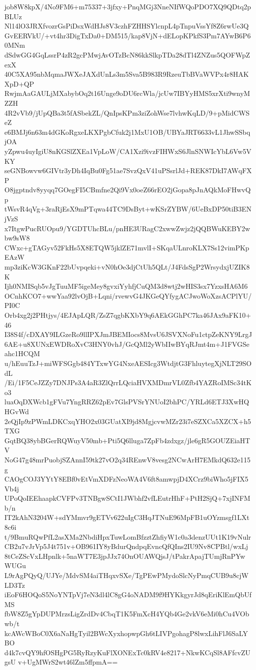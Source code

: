 job8W8kpX/4No9FM6+m75337+3jfxy+PnqMGj3NneNIfWQoPDO7XQ9QDtq2pBLUz
Nl14lO3JRXfvozrGsPiDsxWdHJs8V3czhFZHHSYlcnpL4pTnpuVssYf8Z6rwUe3Q
GvEERVkU/+vt4hr3DigTxDa0+DM515/kap8VjN+dELopKPkfS3Pm7AYwB6P60MNm
dSdwGG4GqLssrP4zR2gcPMwjAvOTzBcN86kkSlkpTDa28dTl4ZNZus5QOFWpZexX
40C5XA95nbMqmaJWXeJAXdUnLs3m5Sva5B983R9RzeuTbBVaWVPx4r8HAKXpD+QP
RwjmAaGAULjMXabybOq2t16Unge9oDU6rcWla/jcUw7IBYyHMS5xrXti9wnyMZZH
4R2vVb9/jUpQBa3t5fASbekZL/QnIpsKPm3ziZohWse7lvhwKqLD/9+pMidCWSeZ
e6BMJj6n63m4dGKoRgxeLKXPgbCfuk2j1MxU1OB/UBYaJRT6633vL1JhwSSbqjOA
yZpwu4uyIgiU8nKGSlZXEa1VpLoW/CA1Xzi9ivzFIHWxS6JlnSNWIcYbL6Vw5VKY
seGNBowvw6GIVtr3yDh4IqBu0Fg51ae7SvzQxV41uPSsrlJd+REK87DkI7AWqFXP
O8jgptndv8yyqq7GOegFI5CBmfne2Qi9Vx0oeZ66rEO2jGopa8pJnAQkMoFHwvQp
tWsvR4qVg+3raRjEsX9mPTqwa44TC9DsByt+wKSrZYBW/6UeBxDP50tiB3ENjVzS
x7ItgwPucRUOpu9/YGDTUhcBLu/pnHE3URagC2xwwZwjz2jQQBWuKEBY2wbw9sW8
CWxc+gTAGyv52FkHs5X8ETQW5jklZE71mvlI+SKqaULnroKLX7Ss12vimPKpEAzW
mp3ziKcW3GKnF22bUvpqeki+vN0hOe3djCtUh5QLt/J4FdsSgP2WrsydxjUZIK8K
Ijh0NMISqb5vJgTuuMF5igeMey8gvxiYyhfjCuQM3d8wtj2wHIS3sx7YzxsHA6M6
OCnhKCO7+wwYaa92lvOjB+Lqni/rvewvG4JKGeQYfygACJwoWoXzsACPlYU/PI0C
Orb4xg2j2PHtjys/4EJApLQR/ZsZ7qgbKXbY9q6AEkGGhPC7ka46JAx9aFK10+46
I38S4f/cDXAY9ILGzeRo9llIPXJmJBEMIocs8MvsU6JSVXNoFu1ctpZeKNY9LrgJ
6AE+u8XUNxEWDRoXvC3HNY0vhJ/GcQMl2yWbIIwBYqRJmt4m+J1FVGSeahc1HCQM
u/hEuuTzJ+miWFSGgb484YTxwYG4NxeAESIcg3WtdjtG3FhluytegXjNLT29SOdL
/Ei/1F5CeJZZy7DNJPs3A4aR3ZlQrrLQciaHVXMDmrVL0Zfb4YAZRoIMSc34tKo3
luaOqDXWcb1gFVu7YngRRZ62pEv7GlsPVSrYNUoI2bhPC/YRLd6ETJ3XwHQHGvWd
2eQjIp9zPWmLDKCxqYHO2x03GUatXI9jd8MgjcvwMZr23i7eSZXCa5XZCX+h5TXG
GqtBQ38ybBGerRQWuyV50mb+Pti5Q6lluga7ZpFb4zdxgz/jle6gR5GOUZEiaHTV
NoG47g48mrPuobjSZAnnI59tk27vO2q34REnwV8vesg2NCwArH7EMkdQ632e115g
CAOgCOJ3YYtY8EBf0vEtVmXDFzNeoWA4V6ft8amwpjD4XCrz9biWho5jFIX5Vb4j
UPoQoIEEhaapkCVFPv3TNBgwSCtI1JWbhf2vfLEutrHhF+PtH2SjQ+7xjINFMb/n
IT2kAhN3204W+sdYMmvr9gETVv622uIgC3HqJTNuE96MpFB1uOYzmsgf1LXt8c6i
t/9BmuRQwPfL2asXMa2NbdiHpxTuwLomBfzztZhfiyW1c0a3denzUUt1K19vNulr
CB2u7vJrVp5J4t751v+OB961IY8yBdurQndpqEvncQfQIns2IU9Nv8CPBtl/wxLj
8tCeZScVxLHpnlk+5naWT7E3jpJJx74OnOUAWQjsJ/tPakrApajTUmjRnPYwWUGu
L9rAgPQyQ/UJYe/MdvSM4aiTHqxvSXe/TgPEwPMydoSlcNyPmqCUB9u8cjWLD3Tz
iEoF6HOQoS5NoYNTpVj7eN3dl4lC8gG4oNADM9f9HYKkgyrJd8qEriKlEmQbUfMS
fbW8Z5gYpDUPMrzsLigZrdDv4CbqT1K5FmXcH4YQb4Ge2vkV6eMi0hCu4VObwb/t
kcAWcWBoC0X6aNaHgTyil2BWcXyxhopwpGh6tLIVPgohagP8lwxLihFlJ6SaLYBO
d4k7cvQY9hfOSHgPG5RyRzyKuFlXONExTc0kRV4e8217+NkwKCqSl8AFfcvZUgsU
v+UgMWrS2wt46lZm5ffpmA==
